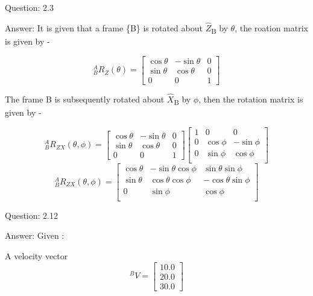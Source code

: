 \documentclass[a4paper]{article}
\begin{document}
\begin{qalist}
			
		\item[Question: 2.3] \setcounter{equation}{0}
		\item[Answer:]
			It is given that a frame \{B\} is rotated about \( \hat{Z} \)\textsubscript{B} by $\theta$\degree, the roation matrix is given by - 

			\begin{equation}
			{}^{A}_{B}{R}_{Z} (\theta) = 
				\left[ \begin{matrix}
					\cos\theta & -\sin\theta & 0 \\
					\sin\theta & \cos\theta & 0 \\
					0 & 0 & 1
				\end{matrix} \right]
			\end{equation}
			
			The frame {B} is subsequently rotated about \(\hat{X}\)\textsubscript{B} by $\phi$\degree, then the rotation matrix is given by - 
			
			\begin{equation}
			{}^{A}_{B}{R}_{Z X} (\theta,\phi) = 
				\left[ \begin{matrix}
					\cos\theta & -\sin\theta & 0 \\
					\sin\theta & \cos\theta & 0 \\
					0 & 0 & 1
				\end{matrix} \right]
				\left[ \begin{matrix}
					1 & 0 & 0 \\
					0 & \cos\phi & -\sin\phi\\
					0 & \sin\phi & \cos\phi\\
				\end{matrix} \right]
			\end{equation}
			\begin{equation}
			{}^{A}_{B}{R}_{Z X} (\theta,\phi) = 
				\left[ \begin{matrix}
					\cos\theta & -\sin\theta\cos\phi & \sin\theta\sin\phi \\
					\sin\theta & \cos\theta\cos\phi & -\cos\theta\sin\phi\\
					0 & \sin\phi & \cos\phi\\
				\end{matrix} \right]
			\end{equation}

		\item[Question: 2.12] \setcounter{equation}{0}
		\item[Answer:]
			Given : 
			
			A velocity vector 
			\begin{equation}
				{}^{B}{V} = 
				\left[ \begin{matrix}
					10.0 \\
					20.0 \\
					30.0
				\end{matrix} \right]
			\end{equation}		
			

\end{qalist}
\end{document}
